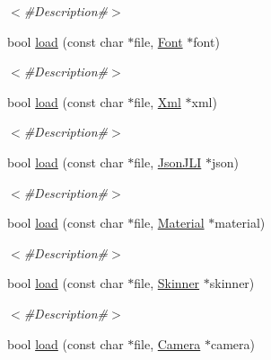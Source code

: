 \begin{DoxyCompactItemize}
\begin{DoxyCompactList}\small\item\em $<$\#\+Description\#$>$ \end{DoxyCompactList}\item 
bool \mbox{\hyperlink{classnjli_1_1_world_resource_loader_aace00d44c99e64510a75ac65a19178aa}{load}} (const char $\ast$file, \mbox{\hyperlink{classnjli_1_1_font}{Font}} $\ast$font)
\begin{DoxyCompactList}\small\item\em $<$\#\+Description\#$>$ \end{DoxyCompactList}\item 
bool \mbox{\hyperlink{classnjli_1_1_world_resource_loader_a5841d6c7619db6821d2bad70dc34bd2b}{load}} (const char $\ast$file, \mbox{\hyperlink{classnjli_1_1_xml}{Xml}} $\ast$xml)
\begin{DoxyCompactList}\small\item\em $<$\#\+Description\#$>$ \end{DoxyCompactList}\item 
bool \mbox{\hyperlink{classnjli_1_1_world_resource_loader_af27a57867941d659a2b497656b3e6b42}{load}} (const char $\ast$file, \mbox{\hyperlink{classnjli_1_1_json_j_l_i}{Json\+J\+LI}} $\ast$json)
\begin{DoxyCompactList}\small\item\em $<$\#\+Description\#$>$ \end{DoxyCompactList}\item 
bool \mbox{\hyperlink{classnjli_1_1_world_resource_loader_a8ea241bd485254b9edf6d3a32b1532db}{load}} (const char $\ast$file, \mbox{\hyperlink{classnjli_1_1_material}{Material}} $\ast$material)
\begin{DoxyCompactList}\small\item\em $<$\#\+Description\#$>$ \end{DoxyCompactList}\item 
bool \mbox{\hyperlink{classnjli_1_1_world_resource_loader_a97c72c0dc49dc9be8ec668fbbfbcf9a0}{load}} (const char $\ast$file, \mbox{\hyperlink{classnjli_1_1_skinner}{Skinner}} $\ast$skinner)
\begin{DoxyCompactList}\small\item\em $<$\#\+Description\#$>$ \end{DoxyCompactList}\item 
bool \mbox{\hyperlink{classnjli_1_1_world_resource_loader_a46e21edb3dd2513f4fb06c2ccce908e5}{load}} (const char $\ast$file, \mbox{\hyperlink{classnjli_1_1_camera}{Camera}} $\ast$camera)

\end{DoxyCompactItemize}
